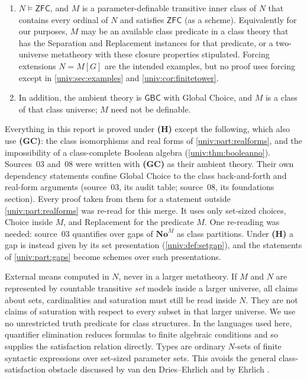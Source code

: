 \documentclass[11pt,letterpaper]{article}
\numberwithin{equation}{section}
\theoremstyle{definition}
\theoremstyle{remark}
\newcommand{\No}{\mathbf{No}}
\newcommand{\NoM}{\No^{M}}
\newcommand{\GBC}{\mathsf{GBC}}
\newcommand{\ZFC}{\mathsf{ZFC}}
\begin{document}
\begin{enumerate}[label=\textbf{(\Alph*)},leftmargin=2.2em]
\item[\textbf{(H)}] $N\models\ZFC$, and $M$ is a parameter-definable
transitive inner class of $N$ that contains every ordinal of $N$ and satisfies
$\ZFC$ (as a scheme). Equivalently for our purposes, $M$ may be an available
class predicate in a class theory that has the Separation and Replacement
instances for that predicate, or a two-universe metatheory with these closure
properties stipulated. Forcing extensions $N=M[G]$ are the intended examples,
but no proof uses forcing except in \cref{univ:sec:examples} and
\cref{univ:cor:finitetower}.
\item[\textbf{(GC)}] In addition, the ambient theory is $\GBC$ with Global
Choice, and $M$ is a class of that class universe; $M$ need not be definable.
\end{enumerate}
Everything in this report is proved under \textbf{(H)} except the following,
which also use \textbf{(GC)}: the class isomorphisms and real forms of
\cref{univ:part:realforms}, and the impossibility of a class-complete Boolean
algebra (\cref{univ:thm:booleanno}). Sources~03 and~08 were written with
\textbf{(GC)} as their ambient theory. Their own dependency statements confine
Global Choice to the class back-and-forth and real-form arguments (source~03,
its audit table; source~08, its foundations section). Every proof taken from
them for a statement outside \cref{univ:part:realforms} was re-read for this
merge. It uses only set-sized choices, Choice inside $M$, and Replacement for
the predicate $M$. One re-reading was needed: source~03 quantifies over gaps
of $\NoM$ as class partitions. Under \textbf{(H)} a gap is instead given by its
set presentation (\cref{univ:def:setgap}), and the statements of
\cref{univ:part:gaps} become schemes over such presentations.

External means computed in $N$, never in a larger metatheory. If $M$ and $N$
are represented by countable transitive \emph{set} models inside a larger
universe, all claims about sets, cardinalities and saturation must still be
read inside $N$. They are not claims of saturation with respect to every
subset in that larger universe. We use no unrestricted truth predicate for
class structures. In the languages used here, quantifier elimination reduces
formulas to finite algebraic conditions and so supplies the satisfaction
relation directly. Types are ordinary $N$-sets of finite syntactic
expressions over set-sized parameter sets. This avoids the general
class-satisfaction obstacle discussed by van den Dries--Ehrlich and by
Ehrlich \cite{vdDE,Ehrlich1989}.
\end{document}

